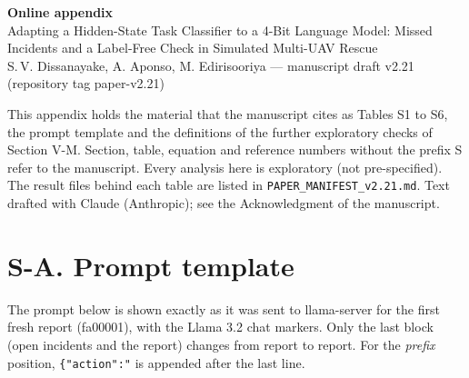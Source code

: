 \documentclass[10pt]{article}
\begin{document}
\begin{center}
{\large\bfseries Online appendix}\\[4pt]
Adapting a Hidden-State Task Classifier to a 4-Bit Language Model: Missed Incidents and a Label-Free Check in Simulated Multi-UAV Rescue\\[2pt]
S.\,V. Dissanayake, A. Aponso, M. Edirisooriya --- manuscript draft v2.21 (repository tag paper-v2.21)
\end{center}

This appendix holds the material that the manuscript cites as Tables S1 to S6, the prompt template and the definitions of the further
exploratory checks of Section V-M. Section, table, equation and reference numbers without the prefix S refer to the manuscript. Every
analysis here is exploratory (not pre-specified). The result files behind each table are listed in \texttt{PAPER\_MANIFEST\_v2.21.md}.
Text drafted with Claude (Anthropic); see the Acknowledgment of the manuscript.

\section*{S-A. Prompt template}


The prompt below is shown exactly as it was sent to llama-server for the first fresh report (fa00001), with the Llama 3.2 chat markers. Only the last block (open incidents and the report) changes from report to report. For the \textit{prefix} position, \texttt{\{"action":"} is appended after the last line.
\end{document}
